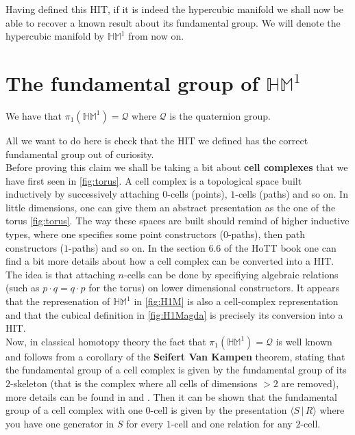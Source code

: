 \documentclass{report}
\begin{document}
Having defined this HIT, if it is indeed the hypercubic manifold we shall now be able to recover a known result about its fundamental group. We will denote the hypercubic manifold by $\mathbb{HM}^1$ from now on.
\section{The fundamental group of $\mathbb{HM}^1$}
\begin{theorem}
  We have that $\pi_1(\mathbb{HM}^1)=\mathcal{Q}$ where $\mathcal{Q}$ is the quaternion group.
\end{theorem}
All we want to do here is check that the HIT we defined has the correct fundamental group out of curiosity.\\
Before proving this claim we shall be taking a bit about \textbf{cell complexes} that we have first seen in \ref{fig:torus}. A cell complex is a topological space built inductively by successively attaching $0$-cells (points), $1$-cells (paths) and so on. In little dimensions, one can give them an abstract presentation as the one of the torus \ref{fig:torus}. The way these spaces are built should remind of higher inductive types, where one specifies some point constructors ($0$-paths), then path constructors ($1$-paths) and so on. In the section 6.6 of the HoTT book \cite{hott} one can find a bit more details about how a cell complex can be converted into a HIT. The idea is that attaching $n$-cells can be done by specifiying algebraic relations (such as $p \cdot q = q \cdot p$ for the torus) on lower dimensional constructors. It appears that the represenation of $\mathbb{HM}^1$ in \ref{fig:H1M} is also a cell-complex representation and that the cubical definition in \ref{fig:H1Magda} is precisely its conversion into a HIT.\\
Now, in classical homotopy theory the fact that $\pi_1(\mathbb{HM}^1)=\mathcal{Q}$ is well known and follows from a corollary of the \textbf{Seifert Van Kampen} theorem, stating that the fundamental group of a cell complex is given by the fundamental group of its $2$-skeleton (that is the complex where all cells of dimensions $>2$ are removed), more details can be found in \cite{hypercubic} and \cite{FundamentalCellComplex}. Then it can be shown that the fundamental group of a cell complex with one $0$-cell is given by the presentation $\langle S \hspace{2pt} \vert\hspace{2pt} R \rangle$ where you have one generator in $S$ for every $1$-cell and one relation for any $2$-cell.\\
\end{document}
